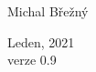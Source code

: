 \begin{center}
	
	\huge
	Michal Břežný %
	\\[0.5cm]
	
	
	
	

	\vfill\vfill\vfill %
	
	
	{\large Leden, 2021
\\ verze 0.9}
	
	
	
	
	
	\vfill %
	
\end{center}

